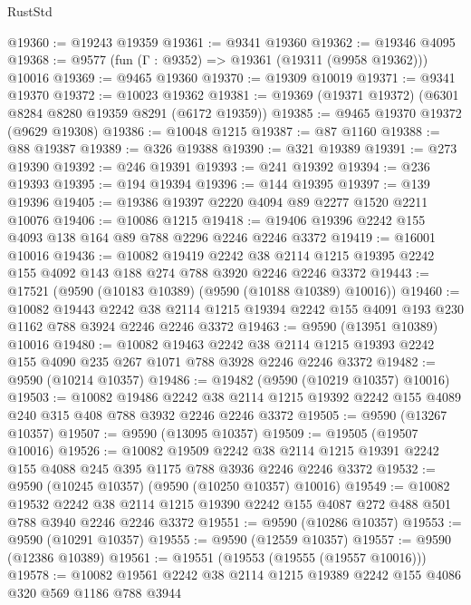 \begin{lexlean}{RustStd}
\begin{coremodule}
@19360 := @19243 @19359
@19361 := @9341 @19360
@19362 := @19346 @4095
@19368 := @9577 (fun (Γ : @9352) => @19361 (@19311 (@9958 @19362))) @10016
@19369 := @9465 @19360
@19370 := @19309 @10019
@19371 := @9341 @19370
@19372 := @10023 @19362
@19381 := @19369 (@19371 @19372) (@6301 @8284 @8280 @19359 @8291 (@6172 @19359))
@19385 := @9465 @19370 @19372 (@9629 @19308)
@19386 := @10048 @1215
@19387 := @87 @1160
@19388 := @88 @19387
@19389 := @326 @19388
@19390 := @321 @19389
@19391 := @273 @19390
@19392 := @246 @19391
@19393 := @241 @19392
@19394 := @236 @19393
@19395 := @194 @19394
@19396 := @144 @19395
@19397 := @139 @19396
@19405 := @19386 @19397 @2220 @4094 @89 @2277 @1520 @2211 @10076
@19406 := @10086 @1215
@19418 := @19406 @19396 @2242 @155 @4093 @138 @164 @89 @788 @2296 @2246 @2246 @3372
@19419 := @16001 @10016
@19436 := @10082
    @19419
    @2242
    @38
    @2114
    @1215
    @19395
    @2242
    @155
    @4092
    @143
    @188
    @274
    @788
    @3920
    @2246
    @2246
    @3372
@19443 := @17521 (@9590 (@10183 @10389) (@9590 (@10188 @10389) @10016))
@19460 := @10082
    @19443
    @2242
    @38
    @2114
    @1215
    @19394
    @2242
    @155
    @4091
    @193
    @230
    @1162
    @788
    @3924
    @2246
    @2246
    @3372
@19463 := @9590 (@13951 @10389) @10016
@19480 := @10082
    @19463
    @2242
    @38
    @2114
    @1215
    @19393
    @2242
    @155
    @4090
    @235
    @267
    @1071
    @788
    @3928
    @2246
    @2246
    @3372
@19482 := @9590 (@10214 @10357)
@19486 := @19482 (@9590 (@10219 @10357) @10016)
@19503 := @10082
    @19486
    @2242
    @38
    @2114
    @1215
    @19392
    @2242
    @155
    @4089
    @240
    @315
    @408
    @788
    @3932
    @2246
    @2246
    @3372
@19505 := @9590 (@13267 @10357)
@19507 := @9590 (@13095 @10357)
@19509 := @19505 (@19507 @10016)
@19526 := @10082
    @19509
    @2242
    @38
    @2114
    @1215
    @19391
    @2242
    @155
    @4088
    @245
    @395
    @1175
    @788
    @3936
    @2246
    @2246
    @3372
@19532 := @9590 (@10245 @10357) (@9590 (@10250 @10357) @10016)
@19549 := @10082
    @19532
    @2242
    @38
    @2114
    @1215
    @19390
    @2242
    @155
    @4087
    @272
    @488
    @501
    @788
    @3940
    @2246
    @2246
    @3372
@19551 := @9590 (@10286 @10357)
@19553 := @9590 (@10291 @10357)
@19555 := @9590 (@12559 @10357)
@19557 := @9590 (@12386 @10389)
@19561 := @19551 (@19553 (@19555 (@19557 @10016)))
@19578 := @10082
    @19561
    @2242
    @38
    @2114
    @1215
    @19389
    @2242
    @155
    @4086
    @320
    @569
    @1186
    @788
    @3944

\end{coremodule}
\end{lexlean}
